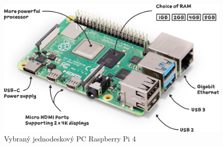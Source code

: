 
%


\begin{figure}[H]
    \begin{center}
        \includegraphics[scale=0.3]{obrazky/raspberry-pi-4.png}
    \end{center}
    \caption{Vybraný jednodeskový PC Raspberry Pi 4 \cite{malina_obr}}
\end{figure}

